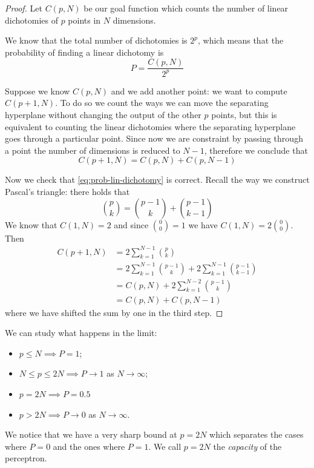 \documentclass[12pt]{extarticle}
\begin{document}
\begin{proof}
	Let $C(p, N)$ be our goal function which counts the number of linear dichotomies of $p$ points
	in $N$ dimensions.

	We know that the total number of dichotomies is $2^p$, which means that the probability of finding
	a linear dichotomy is
	\begin{equation}
		P = \frac{C(p, N)}{2^p}
	\end{equation}

	Suppose we know $C(p, N)$ and we add another point: we want to compute $C(p + 1, N)$.
	To do so we count the ways we can move the separating hyperplane without changing the output
	of the other $p$ points, but this is equivalent to counting the linear dichotomies where
	the separating hyperplane goes through a particular point.
	Since now we are constraint by passing through a point the number of dimensions
	is reduced to $N-1$, therefore we conclude that
	\begin{equation}
		C(p+1, N) = C(p, N) + C(p, N-1)
	\end{equation}

	Now we check that \cref{eq:prob-lin-dichotomy} is correct.
	Recall the way we construct Pascal's triangle: there holds that
	\begin{equation}
		\binom{p}{k} = \binom{p-1}{k} + \binom{p-1}{k-1}
	\end{equation}
	We know that $C(1, N) = 2$ and since $\binom{0}{0} = 1$ we have $C(1, N) = 2 \binom{0}{0}$.
	Then
	\begin{align}
		C(p+1, N) & = 2 \sum_{k = 1}^{N-1} \binom{p}{k}                                           \\
		          & = 2 \sum_{k = 1}^{N-1} \binom{p-1}{k} + 2 \sum_{k = 1}^{N-1} \binom{p-1}{k-1} \\
		          & = C(p, N) + 2 \sum_{k = 1}^{N-2} \binom{p-1}{k}                               \\
		          & = C(p, N) + C(p, N-1)
	\end{align}
	where we have shifted the sum by one in the third step.
\end{proof}

We can study what happens in the limit:
\begin{itemize}
	\item $p \leq N \implies P = 1$;
	\item $N \leq p \leq 2N \implies P \to 1$ as $N \to \infty$;
	\item $p = 2N \implies P = 0.5$
	\item $p > 2N \implies P \to 0$ as $N\to \infty$.
\end{itemize}
We notice that we have a very sharp bound at $p = 2N$ which separates the cases where $P = 0$ and
the ones where $P = 1$. We call $p = 2N$ the \emph{capacity} of the perceptron.
\end{document}
